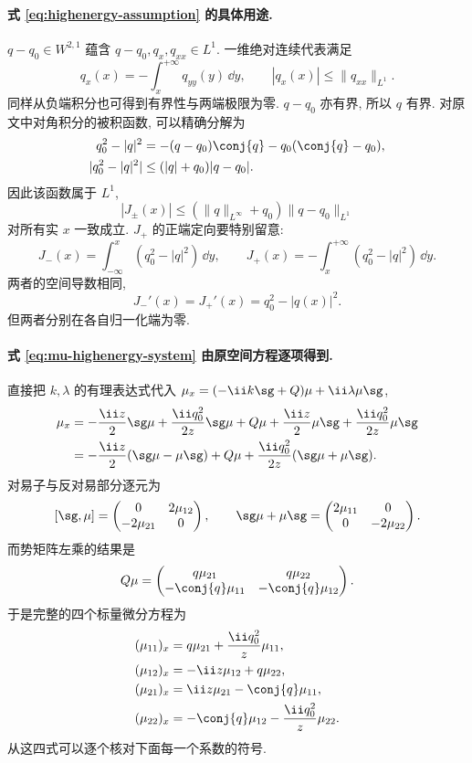 \paragraph{式 \eqref{eq:highenergy-assumption} 的具体用途.}
$q-q_0\in W^{2,1}$ 蕴含 $q-q_0,q_x,q_{xx}\in L^1$.
一维绝对连续代表满足
\[
q_x(x)=-\int_x^{+\infty}q_{yy}(y)\,\dd y,
\qquad
|q_x(x)|\le\|q_{xx}\|_{L^1}.
\]
同样从负端积分也可得到有界性与两端极限为零.
$q-q_0$ 亦有界, 所以 $q$ 有界.
对原文中对角积分的被积函数, 可以精确分解为
\begin{align*}
q_0^2-|q|^2
&=-(q-q_0)\conj{q}-q_0(\conj{q}-q_0),\\
|q_0^2-|q|^2|
&\le(|q|+q_0)|q-q_0|.
\end{align*}
因此该函数属于 $L^1$,
\[
|J_\pm(x)|\le(\|q\|_{L^\infty}+q_0)\|q-q_0\|_{L^1}
\]
对所有实 $x$ 一致成立.
$J_+$ 的正端定向要特别留意:
\[
J_-(x)=\int_{-\infty}^{x}(q_0^2-|q|^2)\,\dd y,
\qquad
J_+(x)=-\int_x^{+\infty}(q_0^2-|q|^2)\,\dd y.
\]
两者的空间导数相同,
\[
J_-'(x)=J_+'(x)=q_0^2-|q(x)|^2.
\]
但两者分别在各自归一化端为零.

\paragraph{式 \eqref{eq:mu-highenergy-system} 由原空间方程逐项得到.}
直接把 $k,\lambda$ 的有理表达式代入
$\mu_x=(-\ii k\sg+Q)\mu+\ii\lambda\mu\sg$,
\begin{align*}
\mu_x
&=-\dfrac{\ii z}{2}\sg\mu
+\dfrac{\ii q_0^2}{2z}\sg\mu
+Q\mu
+\dfrac{\ii z}{2}\mu\sg
+\dfrac{\ii q_0^2}{2z}\mu\sg\\
&=-\dfrac{\ii z}{2}(\sg\mu-\mu\sg)
+Q\mu+\dfrac{\ii q_0^2}{2z}(\sg\mu+\mu\sg).
\end{align*}
对易子与反对易部分逐元为
\[
[\sg,\mu]=\begin{pmatrix}0&2\mu_{12}\\-2\mu_{21}&0\end{pmatrix},
\qquad
\sg\mu+\mu\sg=\begin{pmatrix}2\mu_{11}&0\\0&-2\mu_{22}\end{pmatrix}.
\]
而势矩阵左乘的结果是
\[
Q\mu=\begin{pmatrix}
q\mu_{21}&q\mu_{22}\\
-\conj{q}\mu_{11}&-\conj{q}\mu_{12}
\end{pmatrix}.
\]
于是完整的四个标量微分方程为
\begin{align*}
(\mu_{11})_x&=q\mu_{21}+\dfrac{\ii q_0^2}{z}\mu_{11},\\
(\mu_{12})_x&=-\ii z\mu_{12}+q\mu_{22},\\
(\mu_{21})_x&=\ii z\mu_{21}-\conj{q}\mu_{11},\\
(\mu_{22})_x&=-\conj{q}\mu_{12}-\dfrac{\ii q_0^2}{z}\mu_{22}.
\end{align*}
从这四式可以逐个核对下面每一个系数的符号.

